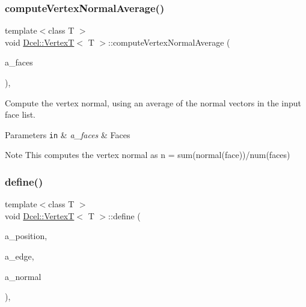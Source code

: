 \subsubsection{\texorpdfstring{compute\+Vertex\+Normal\+Average()}{computeVertexNormalAverage()}}
{\footnotesize\ttfamily template$<$class T $>$ \\
void \hyperlink{classDcel_1_1VertexT}{Dcel\+::\+VertexT}$<$ T $>$\+::compute\+Vertex\+Normal\+Average (\begin{DoxyParamCaption}\item[{const std\+::vector$<$ \hyperlink{classDcel_1_1VertexT_a5acb4c66c49319683c71f52e56ad8e8a}{Face\+Ptr} $>$ \&}]{a\+\_\+faces }\end{DoxyParamCaption})\hspace{0.3cm}{\ttfamily [inline]}, {\ttfamily [noexcept]}}



Compute the vertex normal, using an average of the normal vectors in the input face list. 


\begin{DoxyParams}[1]{Parameters}
\mbox{\tt in}  & {\em a\+\_\+faces} & Faces \\
\hline
\end{DoxyParams}
\begin{DoxyNote}{Note}
This computes the vertex normal as n = sum(normal(face))/num(faces) 
\end{DoxyNote}
\mbox{\label{classDcel_1_1VertexT_a20a894d436707a4205501bbc5cd72323}} 
\subsubsection{\texorpdfstring{define()}{define()}}
{\footnotesize\ttfamily template$<$class T $>$ \\
void \hyperlink{classDcel_1_1VertexT}{Dcel\+::\+VertexT}$<$ T $>$\+::define (\begin{DoxyParamCaption}\item[{const \hyperlink{classDcel_1_1VertexT_a6e073dc7426756edef5594816be6e7c7}{Vec3} \&}]{a\+\_\+position,  }\item[{const \hyperlink{classDcel_1_1VertexT_a7c049a24ac43b9750578e4f4ed543831}{Edge\+Ptr} \&}]{a\+\_\+edge,  }\item[{const \hyperlink{classDcel_1_1VertexT_a6e073dc7426756edef5594816be6e7c7}{Vec3} \&}]{a\+\_\+normal }\end{DoxyParamCaption})\hspace{0.3cm}{\ttfamily [inline]}, {\ttfamily [noexcept]}}



